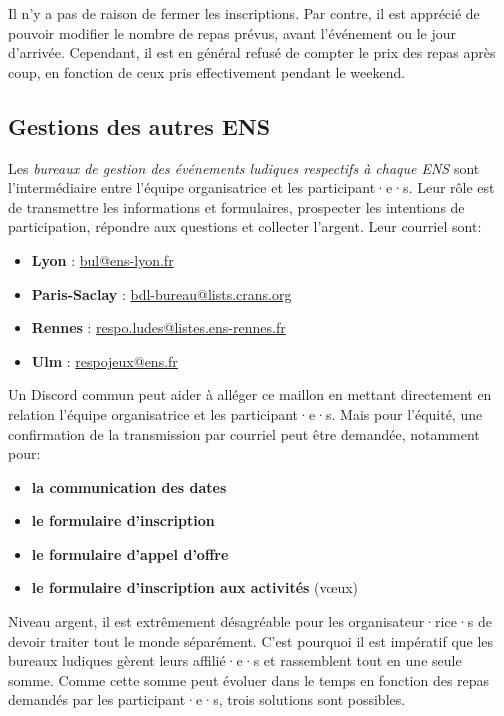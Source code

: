 Il n'y a pas de raison de fermer les inscriptions. Par contre, il est apprécié de pouvoir modifier le nombre de repas prévus, avant l'événement ou le jour d'arrivée. Cependant, il est en général refusé de compter le prix des repas après coup, en fonction de ceux pris effectivement pendant le weekend.

\subsection{Gestions des autres ENS}\label{sec:autres-ENS}

Les \emph{bureaux de gestion des événements ludiques respectifs à chaque ENS} sont l'intermédiaire entre l'équipe organisatrice et les participant·e·s. Leur rôle est de transmettre les informations et formulaires, prospecter les intentions de participation, répondre aux questions et collecter l'argent. Leur courriel sont:

\newcommand{\email}[1]{\href{mailto:#1}{#1}}
\begin{itemize}
    \item \textbf{Lyon} : \email{bul@ens-lyon.fr}
    \item \textbf{Paris-Saclay} : \email{bdl-bureau@lists.crans.org}
    \item \textbf{Rennes} : \email{respo.ludes@listes.ens-rennes.fr}
    \item \textbf{Ulm} : \email{respojeux@ens.fr}
\end{itemize}

Un Discord commun peut aider à alléger ce maillon en mettant directement en relation l'équipe organisatrice et les participant·e·s. Mais pour l'équité, une confirmation de la transmission par courriel peut être demandée, notamment pour:

\begin{itemize}
    \item \textbf{la communication des dates}
    \item \textbf{le formulaire d'inscription}
    \item \textbf{le formulaire d'appel d'offre}
    \item \textbf{le formulaire d'inscription aux activités} (vœux)
\end{itemize}

Niveau argent, il est extrêmement désagréable pour les organisateur·rice·s de devoir traiter tout le monde séparément. C'est pourquoi il est impératif que les bureaux ludiques gèrent leurs affilié·e·s et rassemblent tout en une seule somme. Comme cette somme peut évoluer dans le temps en fonction des repas demandés par les participant·e·s, trois solutions sont possibles.

